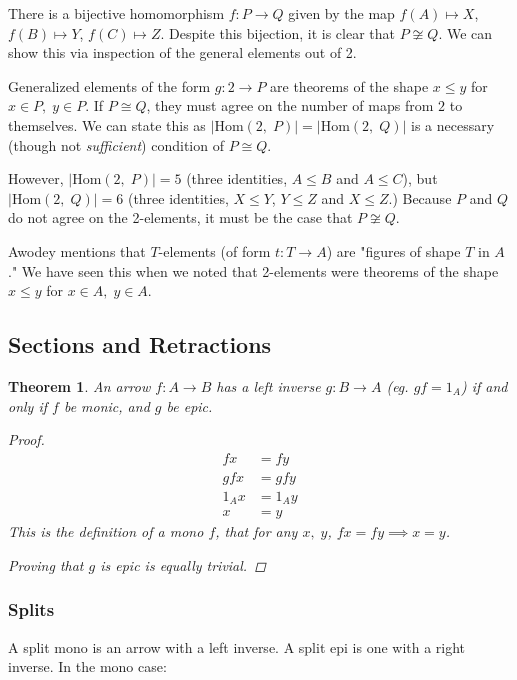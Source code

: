 \documentclass[]{article}
\newtheorem{theorem}{Theorem}
\newcommand{\abs}[1]{\left|#1\right|}
\renewcommand{\hom}[2]{\ensuremath{\text{Hom}(#1,\;#2)}}
\newcommand{\tfarr}[4][\to]{\ensuremath{#2 : #3 #1 #4}}
\begin{document}
There is a bijective homomorphism \tfarr{f}{P}{Q} given by the map $f(A) \mapsto
X$, $f(B) \mapsto Y$, $f(C) \mapsto Z$. Despite this bijection, it is clear that
$P \not \cong Q$. We can show this via inspection of the general elements out of
2.

Generalized elements of the form \tfarr{g}{2}{P} are theorems of the shape $x
\leq y$ for $x \in P,\; y \in P$. If $P \cong Q$, they must agree on the number
of maps from $2$ to themselves. We can state this as $\abs{\hom{2}{P}} =
\abs{\hom{2}{Q}}$ is a necessary (though not \textit{sufficient}) condition of
$P \cong Q$.

However, $\abs{\hom{2}{P}} = 5$ (three identities, $A\leq B$ and $A\leq C$), but
$\abs{\hom{2}{Q}} = 6$ (three identities, $X \leq Y$, $Y \leq Z$ and $X\leq Z$.)
Because $P$ and $Q$ do not agree on the 2-elements, it must be the case that $P
\not \cong Q$.

Awodey mentions that $T$-elements (of form \tfarr{t}{T}{A}) are "figures of
shape $T$ in $A$." We have seen this when we noted that 2-elements were theorems
of the shape $x \leq y$ for $x \in A,\; y \in A$.

\subsection{Sections and Retractions}

\begin{theorem}
  An arrow \tfarr{f}{A}{B} has a left inverse \tfarr{g}{B}{A} (eg. $gf = 1_A$)
  if and only if $f$ be monic, and $g$ be epic.

  \begin{proof}
    \qquad
    \begin{align*}
      fx &= fy \\
      gfx &= gfy \\
      1_A x &= 1_A y \\
      x &= y
    \end{align*}
    This is the definition of a mono $f$, that for any $x,\; y$, $fx = fy
    \implies x = y$.

    Proving that $g$ is epic is equally trivial.
  \end{proof}
\end{theorem}

\subsubsection{Splits}

A split mono is an arrow with a left inverse. A split epi is one with a right
inverse. In the mono case:
\end{document}
